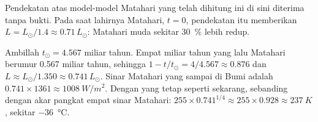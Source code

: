 Pendekatan atas model-model Matahari yang telah dihitung ini di sini diterima
tanpa bukti. Pada saat lahirnya Matahari, $t = 0$, pendekatan itu memberikan
$L = L_\odot/1.4 \approx 0.71\,L_\odot$: Matahari muda sekitar
\qty{30}{\percent} lebih redup.

\begin{example}\label{ex:g12:early-earth:young-sun}
Ambillah $t_\odot = 4.567$ miliar tahun. Empat miliar tahun yang lalu Matahari
berumur 0.567 miliar tahun, sehingga $1 - t/t_\odot = 4/4.567 \approx 0.876$ dan
$L \approx L_\odot/1.350 \approx 0.741\,L_\odot$. Sinar Matahari yang sampai di
Bumi adalah $0.741 \times 1361 \approx \qty{1008}{W/m^2}$. Dengan  yang
tetap seperti sekarang,  sebanding dengan akar pangkat empat
sinar Matahari: $255 \times 0.741^{1/4} \approx 255 \times 0.928 \approx
\qty{237}{K}$, sekitar \qty{-36}{\celsius}.
\end{example}

